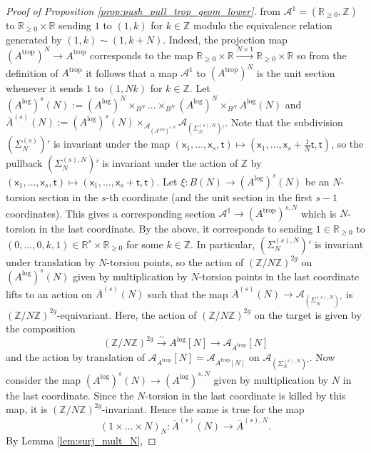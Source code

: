 \documentclass[11pt]{article}
\newcommand{\trop}{\mathrm{trop}}
\renewcommand{\log}{\mathrm{log}}
\newcommand{\barA}{\overline{A}}
\newcommand{\logA}{{A^{\log}}}
\newcommand{\tropA}{{A^{\trop}}}
\theoremstyle{definition}
\begin{document}
\begin{proof}[Proof of Proposition \ref{prop:push_pull_trop_geom_lower}]
	from $\mathcal{A}^{1}=(\mathbb{R}_{\ge 0},\mathbb{Z})$
	to $\mathbb{R}_{\ge 0}\times \mathbb{R}$ sending $1$ to $(1,k)$ for $k\in \mathbb{Z}$ modulo the equivalence relation generated by $(1,k)\sim (1,k+N)$. Indeed, the projection map
	$(\tropA)^{N}\to \tropA$ corresponds to the map $\mathbb{R}_{\ge 0}\times \mathbb{R}\xrightarrow{N\times 1}\mathbb{R}_{\ge 0}\times \mathbb{R}$
	so from the definition of $\tropA$ it follows that a map $\mathcal{A}^{1}$ to $(\tropA)^{N}$ is the unit section whenever it
	sends $1$ to $(1,Nk)$ for $k\in \mathbb{Z}$. Let $(\logA)^{s}(N):=(\logA)^{N}\times_{B^{N}}\dots\times_{B^{N}} (\logA)^{N}\times_{B^{N}} \logA(N)$
	and $\barA^{(s)}(N):=(\logA)^{s}(N)\times_{\mathcal{A}_{(\tropA)^{s,N}}}\mathcal{A}_{(\Sigma_N^{(s),N})'}$. Note that the subdivision
	$(\Sigma_N^{(s)})'$ is invariant under the map $(\mathsf{x}_1,\dots,\mathsf{x}_s,\mathsf{t})\mapsto (\mathsf{x}_1,\dots,\mathsf{x}_s+\frac{1}{N}\mathsf{t},\mathsf{t})$, so the pullback
	$(\Sigma_N^{(s),N})'$ is invariant under the action of $\mathbb{Z}$ by $(\mathsf{x}_1,\dots,\mathsf{x}_s,\mathsf{t})\mapsto (\mathsf{x}_1,\dots,\mathsf{x}_s+\mathsf{t},\mathsf{t})$.
	Let $\xi:B(N)\to (\logA)^{s}(N)$ be an $N$-torsion section in the $s$-th coordinate (and the unit section in the first $s-1$ coordinates).
	This gives a corresponding section $\mathcal{A}^{1}\to (\tropA)^{s,N}$ which is $N$-torsion in the last coordinate. By the above,
	it corresponds to sending $1\in \mathbb{R}_{\ge 0}$ to $(0,\dots,0,k,1)\in \mathbb{R}^{s}\times\mathbb{R}_{\ge 0}$ for some
	$k\in \mathbb{Z}$. In particular, $(\Sigma_N^{(s),N})'$ is invariant under translation by $N$-torsion points, so the
	action of $(\mathbb{Z}/N\mathbb{Z})^{2g}$ on $(\logA)^{s}(N)$ given by multiplication by $N$-torsion points in the last coordinate lifts to an action
	on $\barA^{(s)}(N)$ such that the map $\barA^{(s)}(N)\to \mathcal{A}_{(\Sigma_N^{(s),N})'}$ is $(\mathbb{Z}/N\mathbb{Z})^{2g}$-equivariant.
	Here, the action of $(\mathbb{Z}/N\mathbb{Z})^{2g}$ on the target is given by the composition
	$$(\mathbb{Z}/N\mathbb{Z})^{2g}\xrightarrow{\sim}\logA[N]\to \mathcal{A}_{\tropA}[N]$$
	and the action by translation of $\mathcal{A}_{\tropA}[N]=\mathcal{A}_{\tropA[N]}$ on $\mathcal{A}_{(\Sigma_N^{(s),N})'}$.
	Now consider the map $(\logA)^{s}(N)\to (\logA)^{s,N}$ given by multiplication by $N$ in the last coordinate. Since the $N$-torsion
	in the last coordinate is killed by this map, it is $(\mathbb{Z}/N\mathbb{Z})^{2g}$-invariant. Hence the same is true for the map
	$$(1\times\dots\times N)_N:\barA^{(s)}(N)\to \barA^{(s),N}.$$
	By Lemma \ref{lem:surj_mult_N},

\end{proof}
\end{document}
